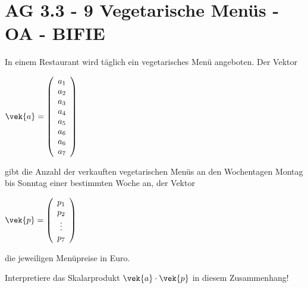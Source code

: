 \section{AG 3.3 - 9 Vegetarische Menüs - OA - BIFIE}

\begin{beispiel}[AG 3.3]{1} %
			In einem Restaurant wird täglich ein vegetarisches Menü angeboten. Der Vektor
				
				
	\footnotesize			\begin{center}
				$\vek{a}=\left(\begin{array}{c}a_1\\ a_2\\ a_3 \\ a_4 \\ a_5 \\ a_6 \\ a_6 \\ a_7\end{array}\right)$
				\end{center}
\normalsize
				
gibt die Anzahl der verkauften vegetarischen Menüs an den Wochentagen Montag bis Sonntag einer bestimmten Woche an, der Vektor
\footnotesize	
\begin{center}
$\vek{p}=\left(\begin{array}{c}p_1\\ p_2\\ \vdots \\ p_7\end{array}\right)$
\end{center}
 \normalsize
die jeweiligen Menüpreise in Euro.

\leer

Interpretiere das Skalarprodukt $\vek{a}\cdot \vek{p}$ in diesem Zusammenhang!

\end{beispiel}